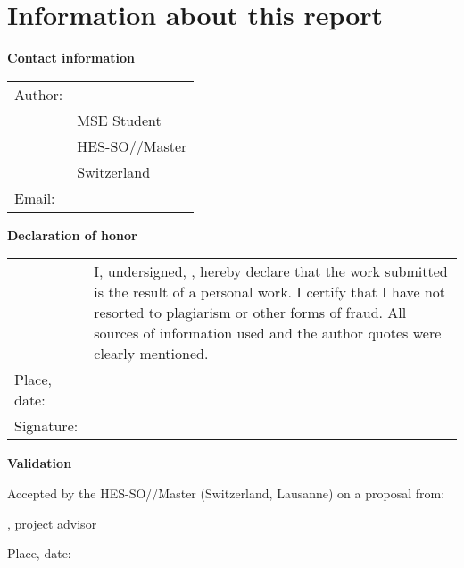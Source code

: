 \setlength{\parindent}{0pt}

\chapter*{Information about this report}

\vspace{\fill}

\textbf{Contact information}

\begin{tabularx}{\textwidth}{N{2.5cm}X}
	Author:	 & \Author \\
	& MSE Student \\
	& HES-SO//Master \\
	& Switzerland \\
	Email: & \email{\AuthorEmail}
\end{tabularx}

\vspace{\fill}

\textbf{Declaration of honor}

{\renewcommand{\arraystretch}{2}
\begin{tabularx}{\textwidth}{N{2.5cm}X}
	& I, undersigned, \Author, hereby declare that the work submitted is
	the result of a personal work. I certify that I have not resorted to
	plagiarism or other forms of fraud. All sources of information used and the
	author quotes were clearly mentioned. \\
	Place, date: & \underline{\hspace{7cm}} \\
	Signature: & \underline{\hspace{7cm}}
\end{tabularx}
}

\vspace{\fill}

\textbf{Validation}

Accepted by the HES-SO//Master (Switzerland, Lausanne) on a proposal from:

\vspace{0.5cm}

\Advisor, project advisor


\vspace{1cm}

Place, date: \underline{\hspace{8cm}}

\vspace{5cm}

